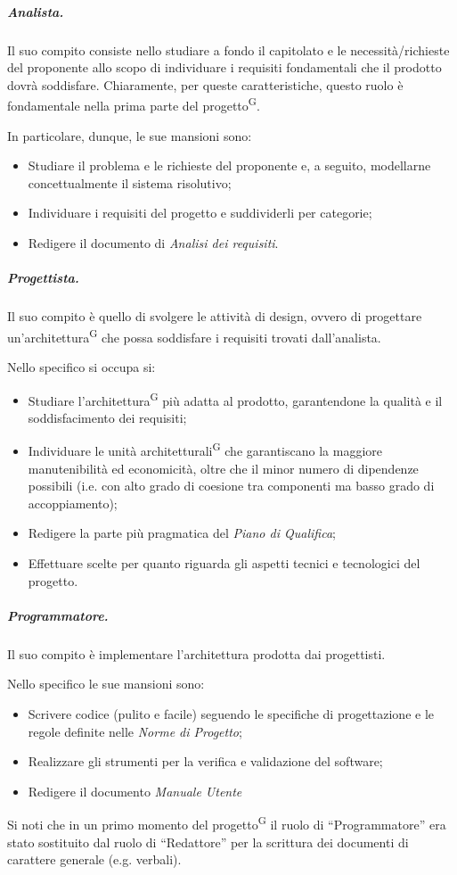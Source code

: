 \subparagraph{Analista.}
Il suo compito consiste nello studiare a fondo il capitolato e le necessità/richieste del proponente allo scopo di individuare i requisiti fondamentali che il prodotto dovrà soddisfare. Chiaramente, per queste caratteristiche, questo ruolo è fondamentale nella prima parte del progetto\textsuperscript{G}.

In particolare, dunque, le sue mansioni sono:
\begin{itemize}
    \item Studiare il problema e le richieste del proponente e, a seguito, modellarne concettualmente il sistema risolutivo;
    \item Individuare i requisiti del progetto e suddividerli per categorie;
    \item Redigere il documento di \textit{Analisi dei requisiti}.
\end{itemize}

\subparagraph{Progettista.}
Il suo compito è quello di svolgere le attività di design, ovvero di progettare un'architettura\textsuperscript{G} che possa soddisfare i requisiti trovati dall'analista.

Nello specifico si occupa si:
\begin{itemize}
    \item Studiare l'architettura\textsuperscript{G} più adatta al prodotto, garantendone la qualità e il soddisfacimento dei requisiti;
    \item Individuare le unità architetturali\textsuperscript{G} che garantiscano la maggiore manutenibilità ed economicità, oltre che il minor numero di dipendenze possibili (i.e. con alto grado di coesione tra componenti ma basso grado di accoppiamento);
    \item Redigere la parte più pragmatica del \textit{Piano di Qualifica};
    \item Effettuare scelte per quanto riguarda gli aspetti tecnici e tecnologici del progetto.
\end{itemize}

\subparagraph{Programmatore.}
Il suo compito è implementare l'architettura prodotta dai progettisti.

Nello specifico le sue mansioni sono:
\begin{itemize}
    \item Scrivere codice (pulito e facile) seguendo le specifiche di progettazione e le regole definite nelle \textit{Norme di Progetto};
    \item Realizzare gli strumenti per la verifica e validazione del software;
    \item Redigere il documento \textit{Manuale Utente}
\end{itemize}
Si noti che in un primo momento del progetto\textsuperscript{G} il ruolo di ``Programmatore'' era stato sostituito dal ruolo di ``Redattore'' per la scrittura dei documenti di carattere generale (e.g. verbali).

